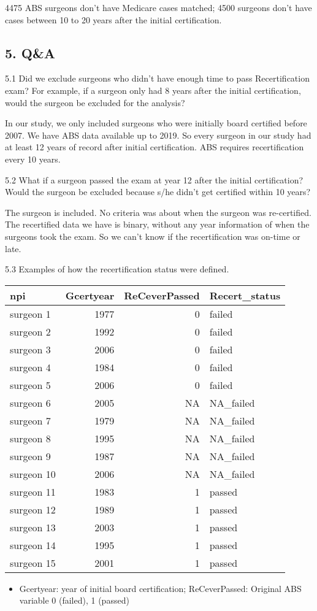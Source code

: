 \documentclass[
]{article}
\providecommand{\tightlist}{%
  \setlength{\itemsep}{0pt}\setlength{\parskip}{0pt}}
\begin{document}
4475 ABS surgeons don't have Medicare cases matched; 4500 surgeons don't
have cases between 10 to 20 years after the initial certification.

\hypertarget{qa}{%
\subsection{5. Q\&A}\label{qa}}

5.1 Did we exclude surgeons who didn't have enough time to pass
Recertification exam? For example, if a surgeon only had 8 years after
the initial certification, would the surgeon be excluded for the
analysis?

In our study, we only included surgeons who were initially board
certified before 2007. We have ABS data available up to 2019. So every
surgeon in our study had at least 12 years of record after initial
certification. ABS requires recertification every 10 years.

5.2 What if a surgeon passed the exam at year 12 after the initial
certification? Would the surgeon be excluded because s/he didn't get
certified within 10 years?

The surgeon is included. No criteria was about when the surgeon was
re-certified. The recertified data we have is binary, without any year
information of when the surgeons took the exam. So we can't know if the
recertification was on-time or late.

5.3 Examples of how the recertification status were defined.

\begin{table}[H]
\centering
\begin{tabular}{l|r|r|l}
\hline
npi & Gcertyear & ReCeverPassed & Recert\_status\\
\hline
surgeon 1 & 1977 & 0 & failed\\
\hline
surgeon 2 & 1992 & 0 & failed\\
\hline
surgeon 3 & 2006 & 0 & failed\\
\hline
surgeon 4 & 1984 & 0 & failed\\
\hline
surgeon 5 & 2006 & 0 & failed\\
\hline
surgeon 6 & 2005 & NA & NA\_failed\\
\hline
surgeon 7 & 1979 & NA & NA\_failed\\
\hline
surgeon 8 & 1995 & NA & NA\_failed\\
\hline
surgeon 9 & 1987 & NA & NA\_failed\\
\hline
surgeon 10 & 2006 & NA & NA\_failed\\
\hline
surgeon 11 & 1983 & 1 & passed\\
\hline
surgeon 12 & 1989 & 1 & passed\\
\hline
surgeon 13 & 2003 & 1 & passed\\
\hline
surgeon 14 & 1995 & 1 & passed\\
\hline
surgeon 15 & 2001 & 1 & passed\\
\hline
\end{tabular}
\end{table}

\begin{itemize}
\tightlist
\item
  Gcertyear: year of initial board certification; ReCeverPassed:
  Original ABS variable 0 (failed), 1 (passed)
\end{itemize}
\end{document}
